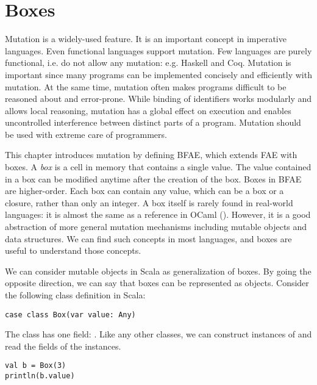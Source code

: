 
\chapter{Boxes}

\renewcommand{\plang}{\textsf{FAE}\xspace}
\renewcommand{\Lang}{\textsf{BFAE}\xspace}

Mutation is a widely-used feature. It is an important concept in imperative
languages. Even functional languages support mutation. Few languages are purely
functional, i.e. do not allow any mutation: e.g. Haskell and Coq. Mutation is
important since many programs can be implemented concisely and efficiently with
mutation. At the same time, mutation often makes programs difficult to be
reasoned about and error-prone. While binding of identifiers works modularly and
allows local reasoning, mutation has a global effect on execution and enables
uncontrolled interference between distinct parts of a program. Mutation should
be used with extreme care of programmers.

This chapter introduces mutation by defining \Lang, which extends \plang with
boxes. A \textit{box} is a cell in memory that contains a single value. The value
contained in a box can be modified anytime after the creation of the box.
Boxes in \Lang are higher-order. Each box can contain any value, which can be
a box or a closure, rather than only an integer.
A box itself is rarely found in real-world languages: it is almost the same as
a reference in OCaml (). However, it is a good abstraction of more
general mutation mechanisms including mutable objects and data
structures. We can find such concepts in most languages, and boxes are useful to
understand those concepts.

We can consider mutable objects in Scala as generalization of boxes. By
going the opposite direction, we can say that boxes can be represented as
objects. Consider the following class definition in Scala:

\begin{verbatim}
case class Box(var value: Any)
\end{verbatim}

The class  has one field: . Like any other classes, we can
construct instances of  and read the fields of the instances.

\begin{verbatim}
val b = Box(3)
println(b.value)
\end{verbatim}

